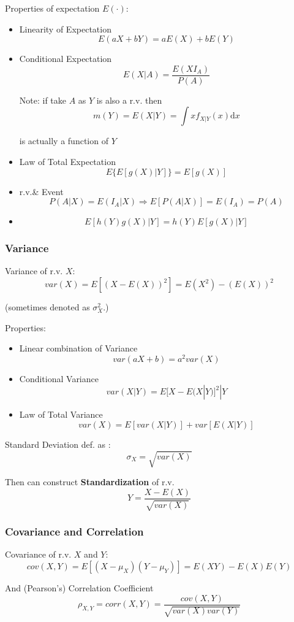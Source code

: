    Properties of expectation $E(\cdot)$:
\begin{itemize}
    \item Linearity of Expectation\[
        E(aX+bY)=aE(X)+bE(Y)
    \]
    \item Conditional Expectation\[
        E(X|A)=\frac{E(XI_A)}{P(A)}
    \]
    
    Note: if take $A$ as $Y$ is also a r.v. then 
    \[m(Y)=E(X|Y)=\int xf_{X|Y}(x)\mathrm{d}x\]

    is actually a function of $Y$

    \item Law of Total Expectation\[
    E\{E[g(X)|Y]\}=E[g(X)]
    \]
    \item r.v.\& Event
    \[
        P(A|X)=E(I_A|X)\Rightarrow E[P(A|X)]=E(I_A)=P(A)
    \]
    \item \[
        E[h(Y)g(X)|Y]=h(Y)E[g(X)|Y]
    \]
\end{itemize}


\subsubsection{Variance}
    Variance of r.v. $X$: 
    \[
        var(X)=E[(X-E(X))^2]=E(X^2)-(E(X))^2
    \]

    (sometimes denoted as $\sigma^2_X$.)

    Properties:
\begin{itemize} 
    \item Linear combination of Variance\[
        var(aX+b)=a^2var(X)
    \]
    \item Conditional Variance
    \[
        var(X|Y)=E{[X-E(X|Y)]^2|Y}
    \]
    \item Law of Total Variance\[
        var(X)=E[var(X|Y)]+var[E(X|Y)]
    \]
\end{itemize}

    Standard Deviation def. as :
    \[\sigma_X=\sqrt{var(X)}\]

    Then can construct \textbf{Standardization} of r.v.
    \[Y=\frac{X-E(X)}{\sqrt{var(X)}}\]


\subsubsection{Covariance and Correlation}\label{SubSubSectionCovarianceAndCorrelation}
    Covariance of r.v. $X$ and $Y$:\[
        cov(X,Y)=E[(X-\mu_X)(Y-\mu_Y)]=E(XY)-E(X)E(Y)
    \]

    And (Pearson's) Correlation Coefficient\[
        \rho_{X,Y}=corr(X,Y)=\frac{cov(X,Y)}{\sqrt{var(X)var(Y)}}
    \]

